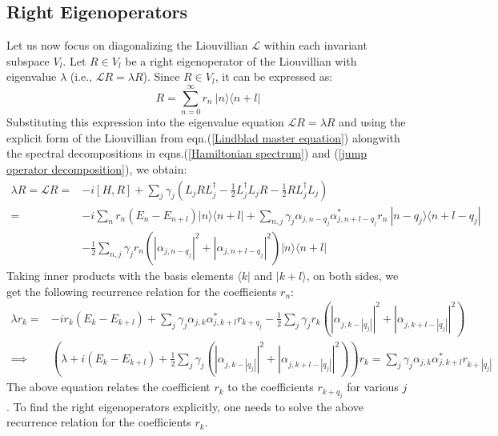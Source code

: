 \documentclass[11pt,a4paper]{article}
\begin{document}
\subsection{Right Eigenoperators}
Let us now focus on diagonalizing the Liouvillian $\mathcal{L}$ within each invariant subspace $V_l$. Let $R \in V_l$ be a right eigenoperator of the Liouvillian with eigenvalue $\lambda$ (i.e., $\mathcal{L} R = \lambda R$). Since $R \in V_l$, it can be expressed as:
\begin{equation}
    R = \sum_{n=0}^{\infty} r_n \ |n\rangle \langle n+l|
\end{equation}
Substituting this expression into the eigenvalue equation $\mathcal{L} R = \lambda R$ and using the explicit form of the Liouvillian from eqn.(\ref{Lindblad master equation}) alongwith the spectral decompositions in eqns.(\ref{Hamiltonian spectrum}) and (\ref{jump operator decomposition}), we obtain:
\begin{align}
    \lambda R = \mathcal{L} R = & -i [H, R] + \sum_{j} \gamma_j \left( L_j R L_j^\dagger - \frac{1}{2} L_j^\dagger L_j R - \frac{1}{2} R L_j^\dagger L_j \right) \\
    = & -i \sum_{n} r_n (E_n - E_{n+l}) |n\rangle \langle n+l| + \sum_{n,j} \gamma_j \alpha_{j,n - q_j} \alpha_{j,n+l - q_j}^* r_{n }\ |n - q_j \rangle \langle n + l - q_j| \nonumber \\
    & - \frac{1}{2} \sum_{n,j} \gamma_j r_n \left( |\alpha_{j,n-q_j}|^2 + |\alpha_{j,n+l-q_j}|^2 \right) |n\rangle \langle n+l| 
\end{align}
Taking inner products with the basis elements $\langle k |$ and $|k+l \rangle$, on both sides, we get the following recurrence relation for the coefficients $r_n$:
\begin{align}
    \lambda r_k = & -i r_k (E_k - E_{k+l}) + \sum_{j} \gamma_j \alpha_{j,k } \alpha_{j,k+l}^* r_{k + q_j} - \frac{1}{2} \sum_{j} \gamma_j r_k \left( |\alpha_{j,k-|q_j|}|^2 + |\alpha_{j,k+l-|q_j|}|^2 \right) \\
    \implies & \left( \lambda + i (E_k - E_{k+l}) + \frac{1}{2} \sum_{j} \gamma_j \left( |\alpha_{j,k-|q_j|}|^2 + |\alpha_{j,k+l-|q_j|}|^2 \right) \right) r_k = \sum_{j} \gamma_j \alpha_{j,k } \alpha_{j,k+l}^* r_{k + |q_j|} \label{right recurrence}
\end{align}
The above equation relates the coefficient $r_k$ to the coefficients $r_{k + q_j}$ for various $j$. To find the right eigenoperators explicitly, one needs to solve the above recurrence relation for the coefficients $r_k$. 
\end{document}
